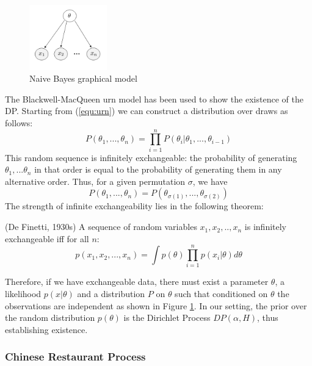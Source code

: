 \begin{figure}[tbhp]
    \centering
    \includegraphics[width=0.3\textwidth, trim={10 10 10 10}]{figures/naive_bayes_gm.png}
    \caption{Naive Bayes graphical model}
    \label{fig:naive_bayes_gm}
\end{figure}

The Blackwell-MacQueen urn model has been used to show the existence of the DP. Starting from (\ref{equ:urn}) we can construct a distribution over draws as follows:
\begin{equation}
    P(\theta_1,...,\theta_n) = \prod_{i=1}^{n}P(\theta_i|\theta_1,...,\theta_{i-1})
\end{equation}
This random sequence is infinitely exchangeable: the probability of generating $\theta_1,...\theta_n$ in that order is equal to the probability of generating them in any alternative order. Thus, for a given permutation $\sigma$, we have
\begin{equation}
    P(\theta_1,...,\theta_n) = P(\theta_{\sigma(1)},...,\theta_{\sigma(2)})
\end{equation}
The strength of infinite exchangeability lies in the following theorem:
\begin{theorem}
(De Finetti, 1930s) A sequence of random variables $x_1, x_2,..,x_n$ is infinitely exchangeable iff for all $n$:
\begin{equation}
    p(x_1,x_2,...,x_n) = \int p(\theta)\prod_{i=1}^{n}p(x_i|\theta)d\theta
\end{equation}
\end{theorem}
Therefore, if we have exchangeable data, there must exist a parameter $\theta$, a likelihood $p(x|\theta)$ and a distribution $P$ on $\theta$ such that conditioned on $\theta$ the observations are independent as shown in Figure \ref{fig:naive_bayes_gm}. In our setting, the prior over the random distribution $p(\theta)$ is the Dirichlet Process $DP(\alpha, H)$, thus establishing existence.

\subsubsection{Chinese Restaurant Process}

